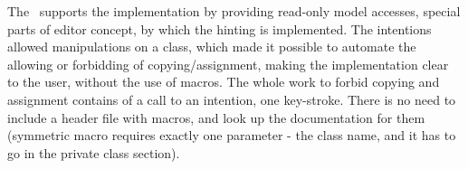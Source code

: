 
The \jbmps\ supports the implementation by providing read-only model accesses, special parts of editor concept, 
by which the hinting is implemented. The intentions allowed manipulations on a class, which made it possible to 
automate the allowing or forbidding of copying/assignment, making the implementation clear to the user, without the 
use of macros. The whole work to forbid copying and assignment contains of a call to an intention, one key-stroke.
There is no need to include a header file with macros, and look up the documentation for them (symmetric macro requires
exactly one parameter - the class name, and it has to go in the private class section).








